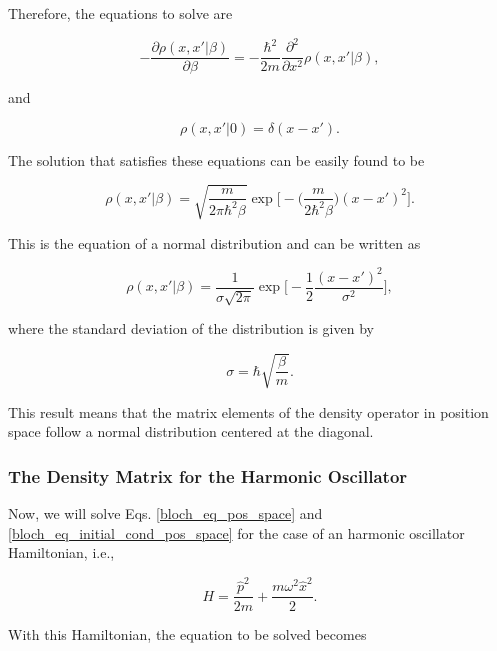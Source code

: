 \documentclass{article}
\begin{document}
Therefore, the equations to solve are

\begin{equation}
    - \frac{\partial \rho(x, x' | \beta)}{\partial \beta} = -\frac{\hbar^{2}}{2m} \frac{\partial^{2}}{\partial x^{2}} \rho(x, x' | \beta),
\end{equation}

and

\begin{equation}
    \rho(x, x' | 0) = \delta(x-x').
\end{equation}

The solution that satisfies these equations can be easily found to be

\begin{equation}
    \rho(x, x' | \beta) = \sqrt{\frac{m}{2\pi \hbar^{2} \beta}} \exp\bigg[-\bigg(\frac{m}{2 \hbar^{2} \beta}\bigg)(x-x')^{2}\bigg].
\end{equation}

This is the equation of a normal distribution and can be written as

\begin{equation}\label{density_matrix_free_particle}
    \rho(x, x' | \beta) = \frac{1}{\sigma \sqrt{2\pi}}\exp\bigg[-\frac{1}{2} \frac{(x-x')^{2}}{\sigma^{2}} \bigg],
\end{equation}

where the standard deviation of the distribution is given by

\begin{equation}
    \sigma = \hbar \sqrt{\frac{\beta}{m}}.
\end{equation}

This result means that the matrix elements of the density operator in position space follow a normal distribution centered at the diagonal.

\subsubsection{The Density Matrix for the Harmonic Oscillator}
Now, we will solve Eqs. \ref{bloch_eq_pos_space} and \ref{bloch_eq_initial_cond_pos_space} for the case of an harmonic oscillator Hamiltonian, i.e.,

\begin{equation}
    H = \frac{\hat{p}^{2}}{2m} + \frac{m \omega^{2} \hat{x}^{2}}{2}.
\end{equation}

With this Hamiltonian, the equation to be solved becomes
\end{document}
